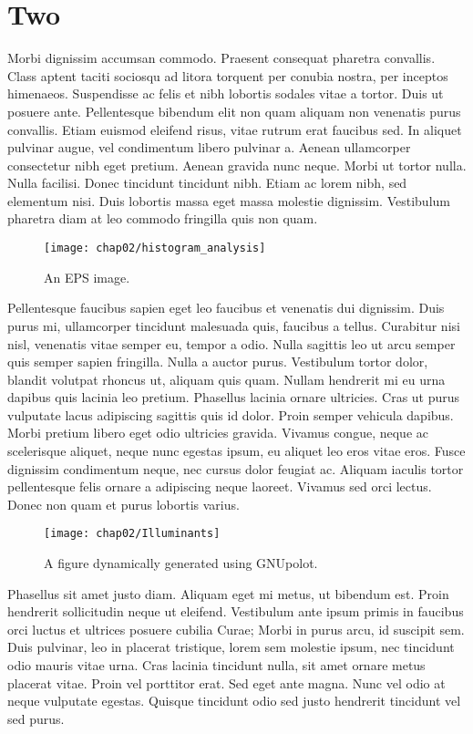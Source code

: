 \chapter{Two}

Morbi dignissim accumsan commodo. Praesent consequat pharetra
convallis. Class aptent taciti sociosqu ad litora torquent per conubia
nostra, per inceptos himenaeos. Suspendisse ac felis et nibh lobortis
sodales vitae a tortor. Duis ut posuere ante. Pellentesque bibendum
elit non quam aliquam non venenatis purus convallis. Etiam euismod
eleifend risus, vitae rutrum erat faucibus sed. In aliquet pulvinar
augue, vel condimentum libero pulvinar a. Aenean ullamcorper
consectetur nibh eget pretium. Aenean gravida nunc neque. Morbi ut
tortor nulla. Nulla facilisi. Donec tincidunt tincidunt nibh. Etiam ac
lorem nibh, sed elementum nisi. Duis lobortis massa eget massa
molestie dignissim. Vestibulum pharetra diam at leo commodo fringilla
quis non quam.

\begin{figure}[hbt]
  \centering
  \texttt{[image: chap02/histogram\_analysis]}
  \caption{An EPS image.}
  \label{fig:AverageHistograms}
\end{figure}

Pellentesque faucibus sapien eget leo faucibus et venenatis dui
dignissim. Duis purus mi, ullamcorper tincidunt malesuada quis,
faucibus a tellus. Curabitur nisi nisl, venenatis vitae semper eu,
tempor a odio. Nulla sagittis leo ut arcu semper quis semper sapien
fringilla. Nulla a auctor purus. Vestibulum tortor dolor, blandit
volutpat rhoncus ut, aliquam quis quam. Nullam hendrerit mi eu urna
dapibus quis lacinia leo pretium. Phasellus lacinia ornare
ultricies. Cras ut purus vulputate lacus adipiscing sagittis quis id
dolor. Proin semper vehicula dapibus. Morbi pretium libero eget odio
ultricies gravida. Vivamus congue, neque ac scelerisque aliquet, neque
nunc egestas ipsum, eu aliquet leo eros vitae eros. Fusce dignissim
condimentum neque, nec cursus dolor feugiat ac. Aliquam iaculis tortor
pellentesque felis ornare a adipiscing neque laoreet. Vivamus sed orci
lectus. Donec non quam et purus lobortis varius.

\begin{figure}[hbt]
  \centering
  \texttt{[image: chap02/Illuminants]}
  \caption{A figure dynamically generated using GNUpolot.}
  \label{fig:Illuminants}
\end{figure}

Phasellus sit amet justo diam. Aliquam eget mi metus, ut bibendum
est. Proin hendrerit sollicitudin neque ut eleifend. Vestibulum ante
ipsum primis in faucibus orci luctus et ultrices posuere cubilia
Curae; Morbi in purus arcu, id suscipit sem. Duis pulvinar, leo in
placerat tristique, lorem sem molestie ipsum, nec tincidunt odio
mauris vitae urna. Cras lacinia tincidunt nulla, sit amet ornare metus
placerat vitae. Proin vel porttitor erat. Sed eget ante magna. Nunc
vel odio at neque vulputate egestas. Quisque tincidunt odio sed justo
hendrerit tincidunt vel sed purus.
